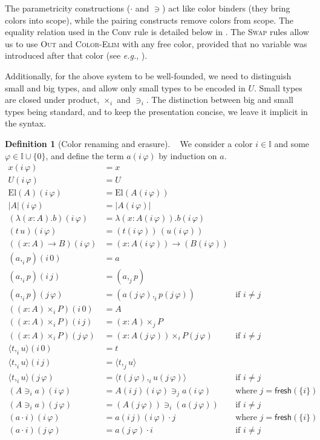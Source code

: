 \documentclass[english]{PaperTools/latex/entcs}
\theoremstyle{plain}
\theoremstyle{definition}
\newtheorem{definition}[theorem]{Definition}
\theoremstyle{remark}
\newcommand\CP[3]{(#2,_{#1} #3)}
\newcommand\CTimes[2]{(#2) ×_{#1}}
\newcommand\op[1]{∋_{#1}}
\newcommand\fp[3]{⟨#2 ,_{#1} #3⟩}
\newcommand\mor[2]{({#1}\,{#2})}
\def\fresh#1{\mathsf{fresh}(#1)}
\def\eg{\textit{e.g.}}
\def\El#1{\mathrm{El}(#1)}
\begin{document}
The parametricity constructions ($·$ and $∋$) act like color
binders (they bring colors into scope), while the pairing constructs
remove colors from scope.
The equality relation used in the {\sc Conv} rule is detailed below in
.  The \textsc{Swap} rules allow us to use
\textsc{Out} and \textsc{Color-Elim} with any free color, provided that
no variable was introduced after that color (see \eg, ).

Additionally, for the above system to be well-founded, we need to
distinguish small and big types, and allow only small types to be
encoded in $U$. Small types are closed under product, $×_i$ and
$∋_i$. The distinction between big and small types being standard, and
to keep the presentation concise, we leave it implicit in the syntax.

\begin{definition}[Color renaming and erasure]~
  \label{def:color-erasure}
  We consider a color $i ∈ 𝕀$ and some $φ ∈ 𝕀 ∪ \{0\}$,
  and define the term $a(i\,φ)$ by induction on $a$.
\begin{align*}
  x \mor{i}{φ} & = x \\
  U \mor{i}{φ} & = U \\
  \El{A} \mor{i}{φ} & = \El {A\mor{i}{φ}} \\
  |A| \mor{i}{φ} & = |A\mor{i}{φ}| \\
  (λ(x:A).b)\mor{i}{φ} &= λ(x:A\mor{i}{φ}).b\mor{i}{φ} \\
  (t\,u)\mor{i}{φ} &= (t\mor{i}{φ}) \, (u\mor{i}{φ}) \\
  ((x:A)→B)\mor{i}{φ} &= (x:A\mor{i}{φ})→(B\mor{i}{φ}) \\
  {\CP {i} a p}\mor{i}{0} &= a \\
  {\CP {i} a p}\mor{i}{j} &= \CP {j} a p \\
  {\CP {i} a p}\mor{j}{φ} &= \CP {i} {a\mor{j}{φ}} {p\mor{j}{φ}} &\text{if $i ≠ j$} \\
  (\CTimes {i} {x:A} P)\mor{i}{0} &= A \\
  (\CTimes {i} {x:A} P)\mor{i}{j} &= \CTimes {j} {x:A} P \\
  (\CTimes {i} {x:A} P)\mor{j}{φ} &= \CTimes {i} {x:A\mor{j}{φ}} {P\mor{j}{φ}} &\text{if $i ≠ j$} \\
  {\fp {i} t u}\mor{i}{0} &= t \\
  {\fp {i} t u}\mor{i}{j} &= \fp {j} t u \\
  {\fp {i} t u}\mor{j}{φ} &= \fp {i} {t\mor{j}{φ}} {u\mor{j}{φ}} &\text{if $i ≠ j$} \\
  (A \op {i} a)\mor{i}{φ} &= {A\mor{i}{j}\mor{i}{φ}} \op {j} {a\mor{i}{φ}} &\text{where $j = \fresh{\{i\}}$} \\
  (A \op {i} a)\mor{j}{φ} &= (A\mor{j}{φ}) \op {i} (a\mor{j}{φ}) &\text{if $i ≠ j$} \\
%
  (a · i)\mor{i}{φ} &= a \mor{i}{j}\mor{i}{φ} · j &\text{where $j = \fresh{\{i\}}$} \\
  (a · i)\mor{j}{φ} &= a\mor{j}{φ} · i &\text{if $i ≠ j$} \\
  \end{align*}
\end{definition}
\end{document}
